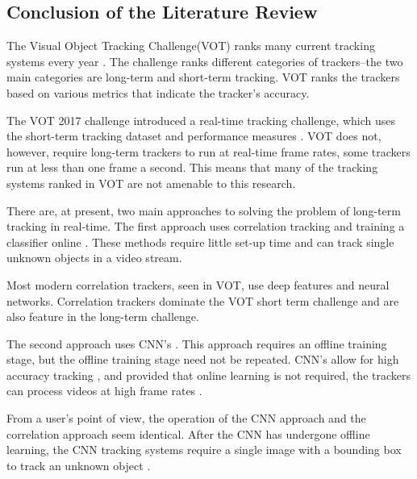   \subsection{Conclusion of the Literature Review}
    The Visual Object Tracking Challenge(VOT) ranks many current tracking systems every year \cite{VOT2017, Kristan2020a}.
    The challenge ranks different categories of trackers--the two main categories are long-term and short-term tracking.
    VOT ranks the trackers based on various metrics that indicate the tracker's accuracy.

    The VOT 2017 challenge introduced a real-time tracking challenge, which uses the short-term tracking dataset and performance measures \cite{Kristan2020a}.
    VOT does not, however, require long-term trackers to run at real-time frame rates, some trackers run at less than one frame a second.
    This means that many of the tracking systems ranked in VOT are not amenable to this research.

    There are, at present, two main approaches to solving the problem of long-term tracking in real-time.
    The first approach uses correlation tracking and training a classifier online \cite{Ma2015Correlation, Enriques2014, Kalal2011}.
    These methods require little set-up time and can track single unknown objects in a video stream.
    
    Most modern correlation trackers, seen in VOT, use deep features and neural networks.
    Correlation trackers dominate the VOT short term challenge and are also feature in the long-term challenge.

    The second approach uses CNN's \cite{bertinetto2016}.
    This approach requires an offline training stage, but the offline training stage need not be repeated.
    CNN's allow for high accuracy tracking \cite{CNNTracking, bertinetto2016}, and provided that online learning is not required, the trackers can process videos at high frame rates \cite{Kristan2020a}.

    From a user's point of view, the operation of the CNN approach and the correlation approach seem identical.
    After the CNN has undergone offline learning, the CNN tracking systems require a single image with a bounding box to track an unknown object \cite{CNNTracking, bertinetto2016}.
